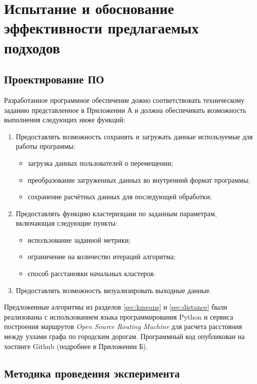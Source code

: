 \chapter{Испытание и обоснование эффективности предлагаемых подходов}
\section{Проектирование ПО}
Разработанное программное обеспечение дожно соответствовать техническому заданию представленное в Приложении А и должна обеспечивать возможность выполнения следующих ниже функций:
\begin{enumerate}
    \item Предоставлять возможность сохранять и загружать данные используемые для работы программы:
    \begin{itemize}
        \item загрузка данных пользователей о перемещении;
        \item преобразование загруженных данных во внутренний формат программы;
        \item сохранение расчётных данных для последующей обработки;
    \end{itemize}
    \item Предоставлять функцию кластеризцаии по заданным параметрам, включающая следующие пункты:
    \begin{itemize}
        \item использование заданной метрики;
        \item ограничение на количество итераций алгоритма;
        \item способ расстановки начальных кластеров.
    \end{itemize}
    \item Предоставлять возможность визуализировать выходные данные.
\end{enumerate}

Предложенные алгоритмы из разделов \ref{sec:kmeans} и \ref{sec:distance} были реализованы с использованием языка программирования Python и сервиса построения маршрутов \emph{Open Source Routing Machine} для расчета расстояния между узлами графа по городским дорогам. Программный код опубликован на хостинге Github (подробнее в Приложении Б).

\section{Методика проведения эксперимента}

